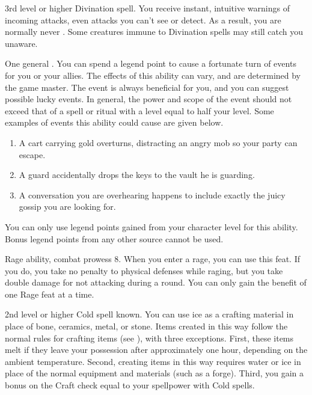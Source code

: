 \featpre 3rd level or higher Divination spell.
\featben You receive instant, intuitive warnings of incoming attacks, even attacks you can't see or detect.
As a result, you are normally never \unaware.
Some creatures immune to Divination spells may still catch you unaware.

\featpre One general .
\featben You can spend a legend point to cause a fortunate turn of events for you or your allies.
The effects of this ability can vary, and are determined by the game master.
The event is always beneficial for you, and you can suggest possible lucky events.
In general, the power and scope of the event should not exceed that of a spell or ritual with a level equal to half your level.
Some examples of events this ability could cause are given below.
\begin{enumerate}
    \item A cart carrying gold overturns, distracting an angry mob so your party can escape.
    \item A guard accidentally drops the keys to the vault he is guarding.
    \item A conversation you are overhearing happens to include exactly the juicy gossip you are looking for.
\end{enumerate}

You can only use legend points gained from your character level for this ability.
Bonus legend points from any other source cannot be used.

\featpres Rage ability, combat prowess 8.
\featben When you enter a rage, you can use this feat. If you do, you take no penalty to physical defenses while raging, but you take double damage for not attacking during a round.
 You can only gain the benefit of one Rage feat at a time.

\featpre 2nd level or higher Cold spell known.
\featben You can use ice as a crafting material in place of bone, ceramics, metal, or stone.
Items created in this way follow the normal rules for crafting items (see ), with three exceptions.
First, these items melt if they leave your possession after approximately one hour, depending on the ambient temperature.
Second, creating items in this way requires water or ice in place of the normal equipment and materials (such as a forge).
Third, you gain a bonus on the Craft check equal to your spellpower with Cold spells.

